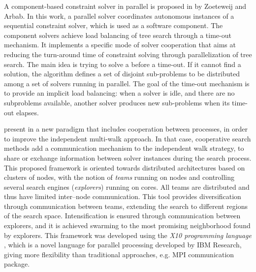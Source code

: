 A component-based constraint solver in parallel is proposed in \cite{Zoeteweij} by Zoeteweij and Arbab. In this work, a parallel solver coordinates autonomous instances of a sequential constraint solver, which is used as a software component. The component solvers achieve load balancing of tree search through a time-out mechanism. It implements a specific mode of solver cooperation that aims at reducing the turn-around time of constraint solving through parallelization of tree search. The main idea is trying to solve a \csp{} before a time-out. If it cannot find a solution, the algorithm defines a set of disjoint sub-problems to be distributed among a set of solvers running in parallel. The goal of the time-out mechanism is to provide an implicit load balancing: when a solver is idle, and there are no subproblems available, another solver produces new sub-problems when its time-out elapses.


 present in \cite{Munera} a new paradigm that includes cooperation between processes, in order to improve the independent multi-walk approach. In that case, cooperative search methods add a communication mechanism to the independent walk strategy, to share or exchange information between solver instances during the search process. This proposed framework is oriented towards distributed architectures based on clusters of nodes, with the notion of {\it teams} running on nodes and controlling several search engines ({\it explorers}) running on cores. All teams are distributed and thus have limited inter--node communication. This tool provides diversification through communication between teams, extending the search to different regions of the search space. Intensification is ensured through communication between explorers, and it is achieved swarming to the most promising neighborhood found by explorers. %
This framework was developed using the {\it X10 programming language} \cite{Saraswat2012}, which is a novel language for parallel processing developed by IBM Research, giving more flexibility than traditional approaches, e.g. MPI communication package.

